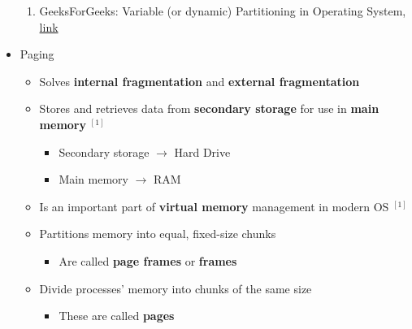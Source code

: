 \documentclass[12pt]{article}
\begin{document}
\begin{itemize}
    \begin{enumerate}[1)]
        \item GeeksForGeeks: Variable (or dynamic) Partitioning in Operating System, \href{https://www.geeksforgeeks.org/variable-or-dynamic-partitioning-in-operating-system/}{link}
    \end{enumerate}
    \item Paging
    \begin{itemize}
        \item Solves \textbf{internal fragmentation} and \textbf{external fragmentation}
        \item Stores and retrieves data from \textbf{secondary storage} for use
        in \textbf{main memory} $^{[1]}$
        \begin{itemize}
            \item Secondary storage $\to$ Hard Drive
            \item Main memory $\to$ RAM
        \end{itemize}
        \item Is an important part of \textbf{virtual memory} management in modern
        OS $^{[1]}$
        \item Partitions memory into equal, fixed-size chunks
        \begin{itemize}
            \item Are called \textbf{page frames} or \textbf{frames}
        \end{itemize}
        \item Divide processes' memory into chunks of the same size
        \begin{itemize}
            \item These are called \textbf{pages}
        \end{itemize}
    \end{itemize}


\end{itemize}
\end{document}
